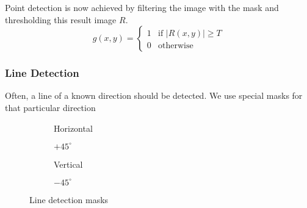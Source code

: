 Point detection is now achieved by filtering the image with the mask and thresholding this result image $R$.
\[
	g(x,y) = 
	\begin{cases}
		1 & \text{if } |R(x,y)| \geq T \\
		0 & \text{otherwise}
	\end{cases}
\]

\subsubsection{Line Detection}
Often, a line of a known direction should be detected. We use special masks for that particular direction
\begin{figure}[H]
	\centering
	\begin{subfigure}[b]{0.2\textwidth}
		\centering
		\caption{Horizontal}
	\end{subfigure}
	\begin{subfigure}[b]{0.2\textwidth}
		\centering
		\caption{$+45^\circ$}
	\end{subfigure}
	\begin{subfigure}[b]{0.2\textwidth}
		\centering
		\caption{Vertical}
	\end{subfigure}
	\begin{subfigure}[b]{0.2\textwidth}
		\centering
		\caption{$-45^\circ$}
	\end{subfigure}
	\caption{Line detection masks}
\end{figure}

